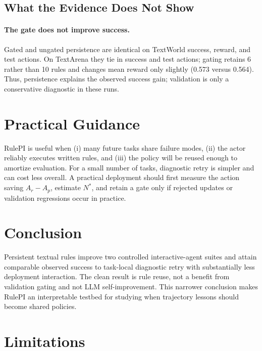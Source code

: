 \documentclass[11pt]{article}
\begin{document}
\subsection{What the Evidence Does Not Show}

\paragraph{The gate does not improve success.}
Gated and ungated persistence are identical on TextWorld success, reward, and test actions.
On TextArena they tie in success and test actions; gating retains 6 rather than 10 rules and changes mean reward only slightly (0.573 versus 0.564).
Thus, persistence explains the observed success gain; validation is only a conservative diagnostic in these runs.

\section{Practical Guidance}

RulePI is useful when (i) many future tasks share failure modes, (ii) the actor reliably executes written rules, and (iii) the policy will be reused enough to amortize evaluation.
For a small number of tasks, diagnostic retry is simpler and can cost less overall.
A practical deployment should first measure the action saving $A_r-A_p$, estimate $N^*$, and retain a gate only if rejected updates or validation regressions occur in practice.

\section{Conclusion}

Persistent textual rules improve two controlled interactive-agent suites and attain comparable observed success to task-local diagnostic retry with substantially less deployment interaction.
The clean result is rule reuse, not a benefit from validation gating and not LLM self-improvement.
This narrower conclusion makes RulePI an interpretable testbed for studying when trajectory lessons should become shared policies.

\section*{Limitations}
\end{document}
